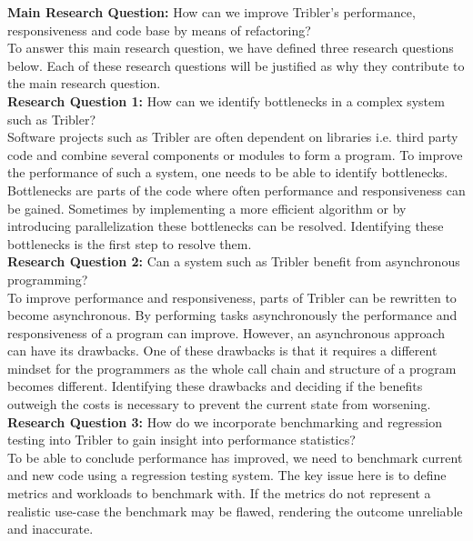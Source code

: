 \textbf{Main Research Question:} How can we improve Tribler's performance, responsiveness and code base by means of refactoring?\\

To answer this main research question, we have defined three research questions below. Each of these research questions will be justified as why they contribute to the main research question.\\

\textbf{Research Question 1:} How can we identify bottlenecks in a complex system such as Tribler?\\

Software projects such as Tribler are often dependent on libraries i.e. third party code and combine several components or modules to form a program.
To improve the performance of such a system, one needs to be able to identify bottlenecks.
Bottlenecks are parts of the code where often performance and responsiveness can be gained. 
Sometimes by implementing a more efficient algorithm or by introducing parallelization these bottlenecks can be resolved.
Identifying these bottlenecks is the first step to resolve them.\\

\textbf{Research Question 2:} Can a system such as Tribler benefit from asynchronous programming?\\

To improve performance and responsiveness, parts of Tribler can be rewritten to become asynchronous.
By performing tasks asynchronously the performance and responsiveness of a program can improve.
However, an asynchronous approach can have its drawbacks. 
One of these drawbacks is that it requires a different mindset for the programmers as the whole call chain and structure of a program becomes different.
Identifying these drawbacks and deciding if the benefits outweigh the costs is necessary to prevent the current state from worsening. \\

\noindent
\textbf{Research Question 3:} How do we incorporate benchmarking and regression testing into Tribler to gain insight into performance statistics?\\

To be able to conclude performance has improved, we need to benchmark current and new code using a regression testing system.
The key issue here is to define metrics and workloads to benchmark with.
If the metrics do not represent a realistic use-case the benchmark may be flawed, rendering the outcome unreliable and inaccurate.

